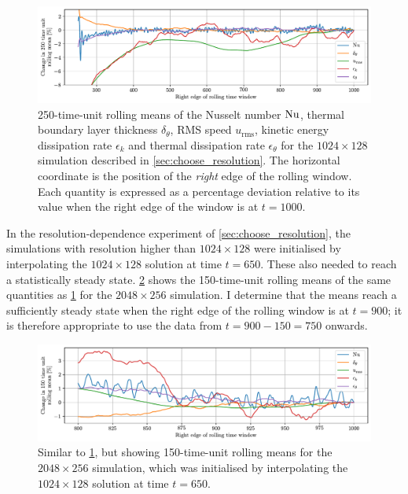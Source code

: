 \documentclass[../main.tex]{subfiles}
\begin{document}
\begin{figure}[ht]
    \centering
    \includegraphics[width=\linewidth]{figures/1024x128_spin_up.pdf}
    \caption{
        250-time-unit rolling means of the Nusselt number $\mathrm{Nu}$, thermal
        boundary layer thickness $\delta_\theta$, RMS speed $u_\mathrm{rms}$,
        kinetic energy dissipation rate $\epsilon_k$ and thermal dissipation
        rate $\epsilon_\theta$ for the $1024 \times 128$ simulation described
        in \cref{sec:choose_resolution}. The horizontal coordinate is the
        position of the \emph{right} edge of the rolling window. Each quantity
        is expressed as a percentage deviation relative to its value when
        the right edge of the window is at $t=1000$.
    }
    \label{fig:1024x128_spin_up}
\end{figure}

In the resolution-dependence experiment of \cref{sec:choose_resolution}, the
simulations with resolution higher than $1024 \times 128$ were initialised by
interpolating the $1024 \times 128$ solution at time $t = 650$. These also
needed to reach a statistically steady state. \cref{fig:2048x256_spin_up} shows
the 150-time-unit rolling means of the same quantities as
\cref{fig:1024x128_spin_up} for the $2048 \times 256$ simulation. I determine
that the means reach a sufficiently steady state when the right edge of the
rolling window is at $t=900$; it is therefore appropriate to use the data
from $t=900-150=750$ onwards.
\begin{figure}[ht]
    \centering
    \includegraphics[width=\linewidth]{figures/2048x256_spin_up.pdf}
    \caption{
        Similar to \cref{fig:1024x128_spin_up}, but showing 150-time-unit
        rolling means for the $2048 \times 256$ simulation, which was
        initialised by interpolating the $1024 \times 128$ solution at time
        $t=650$.
    }
    \label{fig:2048x256_spin_up}
\end{figure}
\end{document}
